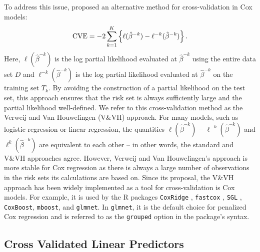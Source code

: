 To address this issue, \citet{Verweij1993} proposed an alternative method for cross-validation in Cox models:
\begin{equation}
\label{eq:VVH}
	\textrm{CVE} = -2\sum_{k = 1}^K \left\{ \ell(\hat{\beta}^{- k})  - \ell^{-k}(\hat{\beta}^{- k}) \right\}. 
\end{equation}
Here, $\ell(\hat{\beta}^{-k})$ is the log partial likelihood evaluated at $\hat{\beta}^{-k}$ using the entire data set $D$ and $\ell^{-k}(\hat{\beta}^{-k})$ is the log partial likelihood evaluated at $\hat{\beta}^{-k}$ on
the training set $T_k$. By avoiding the construction of a partial likelihood on the test set, this approach ensures that the risk set is always sufficiently large and the partial likelihood well-defined.  We refer to this cross-validation method as the Verweij and Van Houwelingen (V\&VH) approach. For many models, such as logistic regression or linear regression, the quantities $\ell(\hat{\beta}^{- k})  - \ell^{-k}(\hat{\beta}^{- k})$ and  $\ell^{k}(\hat{\beta}^{-k})$ are equivalent to each other -- in other words, the standard and V\&VH approaches agree.  However, Verweij and Van Houwelingen's approach is more stable for Cox regression as there is always a large number of observations in the risk sets its calculations are based on.  Since its proposal, the V\&VH approach has been widely implemented as a tool for cross-validation is Cox models.  For example, it is used by the R packages {\tt CoxRidge} \citep{CoxRidge}, {\tt fastcox} \citep{fastcox}, {\tt SGL}\citep{SGL} , {\tt CoxBoost}\citep{CoxBoost}, {\tt mboost}\citep{mboost}, and {\tt glmnet}\citep{glmnet}.  In {\tt glmnet}, it is the default choice for penalized Cox regression and is referred to as the {\tt grouped} option in the package's syntax.

\subsection{Cross Validated Linear Predictors}
\label{Sec:linear-predictor}

